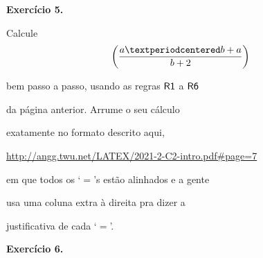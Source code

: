 \documentclass[oneside,12pt]{article}
\begin{document}
\newpage

{\bf Exercício 5.}

Calcule
%
$$\D
  \left(
  \frac{a·b+a}{b+2}
  \right) \ga{s1}
$$

bem passo a passo, usando as regras $\mathsf{R1}$ a $\mathsf{R6}$

da página anterior. Arrume o seu cálculo

exatamente no formato descrito aqui,


\msk

{\footnotesize

\url{http://angg.twu.net/LATEX/2021-2-C2-intro.pdf#page=7}

}

\msk

em que todos os `$=$'s estão alinhados e a gente

usa uma coluna extra à direita pra dizer a

justificativa de cada `$=$'.



\newpage


%                                                 

\def\Expr{\ang{\mathsf{expr}}}
\def\Just{\ang{\mathsf{justificativa}}}

{\bf Exercício 6.}
\end{document}
